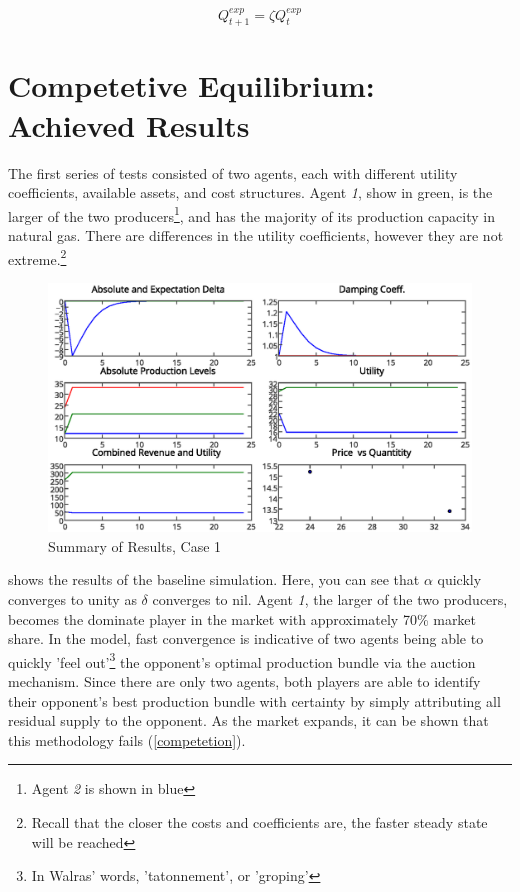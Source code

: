 \documentclass[12pt]{article}
\begin{document}
 	\begin{equation}
 		Q_{t+1}^{exp} = \zeta Q_{t}^{exp}
 	\end{equation}



\section{Competetive Equilibrium: Achieved Results}
The first series of tests consisted of two agents, each with different utility coefficients, available assets, and cost structures. Agent \emph{1}, show in green, is the larger of the two producers\footnote{Agent \emph{2} is shown in blue}, and has the majority of its production capacity in natural gas. There are differences in the utility coefficients, however they are not extreme.\footnote{Recall that the closer the costs and coefficients are, the faster steady state will be reached}

	\begin{figure}[ht!]
		\begin{center}
		\includegraphics[scale = .75]{2Player.eps}
		\caption{Summary of Results, Case 1}
		\label{results1}
		\end{center}
	\end{figure}

 shows the results of the baseline simulation. Here, you can see that $ \alpha $ quickly converges to unity as $\delta$ converges to nil. Agent \emph{1}, the larger of the two producers, becomes the dominate player in the market with approximately 70\% market share. In the model, fast convergence is indicative of  two agents being able to quickly 'feel out'\footnote{In Walras' words, 'tatonnement', or 'groping'} the opponent's optimal production bundle via the auction mechanism. Since there are only two agents, both players are able to identify their opponent's best production bundle with certainty by simply attributing all residual supply to the opponent. As the market expands, it can be shown that this methodology fails (\cref{competetion}). \*
\end{document}
